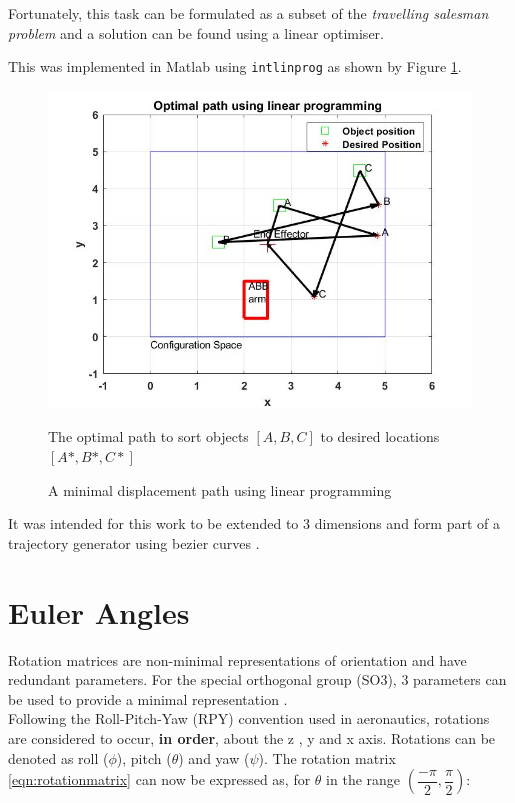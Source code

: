 \documentclass{UoNMCHA}
\numberwithin{equation}{section}
\begin{document}
Fortunately, this task can be formulated as a subset of the \textit{travelling salesman problem} and a solution can be found using a linear optimiser. \

This was implemented in Matlab using \texttt{intlinprog} as shown by Figure \ref{fig:travellingsalesman}. 

\begin{figure}[H]
	\begin{center}
		\includegraphics[width=.6\linewidth]{Figures/optimalpath}
		\caption{The optimal path to sort objects $[A,B,C]$ to desired locations $[A*,B*,C*]$}
		\caption{A minimal displacement path using linear programming}
		\label{fig:travellingsalesman}
	\end{center}
\end{figure}

It was intended for this work to be extended to 3 dimensions and form part of a trajectory generator using bezier curves \citep{choi2008path}.


\section{Euler Angles}\label{App:Euler Angles}

Rotation matrices are non-minimal representations of orientation and have redundant parameters. For the special orthogonal group (SO3), 3 parameters can be used to provide a minimal representation \cite{siciliano2010robotics}. \\

Following the Roll-Pitch-Yaw (RPY) convention used in aeronautics, rotations are considered to occur, \textbf{in order}, about the z , y and x axis. Rotations can be denoted as roll ($\phi$), pitch ($\theta$) and yaw ($\psi$). The rotation matrix \ref{eqn:rotationmatrix} can now be expressed as, for $\theta$ in the range $(\dfrac{-\pi}{2} , \dfrac{\pi}{2})$:
\end{document}
